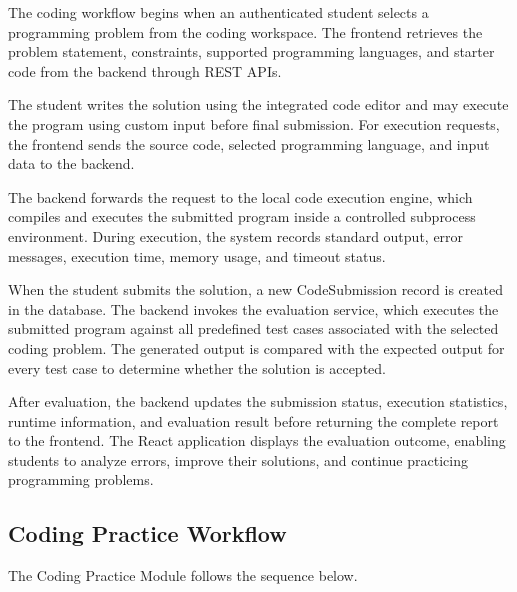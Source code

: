The coding workflow begins when an authenticated student selects a programming problem from the coding workspace. The frontend retrieves the problem statement, constraints, supported programming languages, and starter code from the backend through REST APIs.

The student writes the solution using the integrated code editor and may execute the program using custom input before final submission. For execution requests, the frontend sends the source code, selected programming language, and input data to the backend.

The backend forwards the request to the local code execution engine, which compiles and executes the submitted program inside a controlled subprocess environment. During execution, the system records standard output, error messages, execution time, memory usage, and timeout status.

When the student submits the solution, a new CodeSubmission record is created in the database. The backend invokes the evaluation service, which executes the submitted program against all predefined test cases associated with the selected coding problem. The generated output is compared with the expected output for every test case to determine whether the solution is accepted.

After evaluation, the backend updates the submission status, execution statistics, runtime information, and evaluation result before returning the complete report to the frontend. The React application displays the evaluation outcome, enabling students to analyze errors, improve their solutions, and continue practicing programming problems.

\subsection{Coding Practice Workflow}

The Coding Practice Module follows the sequence below.

